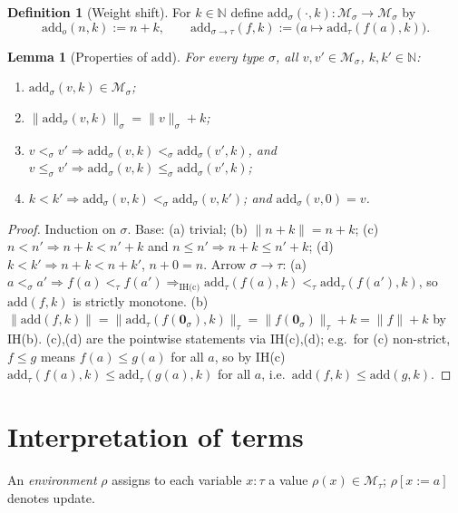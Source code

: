 \documentclass{amsart}
\newtheorem{lemma}{Lemma}
\theoremstyle{definition}
\newtheorem{definition}{Definition}
\begin{document}
\begin{definition}[Weight shift]\label{def:add}
For $k\in\mathbb N$ define $\mathrm{add}_\sigma(\cdot,k):\mathcal M_\sigma\to\mathcal M_\sigma$ by
\[
  \mathrm{add}_o(n,k):=n+k,\qquad
  \mathrm{add}_{\sigma\to\tau}(f,k):=\bigl(a\mapsto\mathrm{add}_\tau(f(a),k)\bigr).
\]
\end{definition}

\begin{lemma}[Properties of $\mathrm{add}$]\label{lem:add}
For every type $\sigma$, all $v,v'\in\mathcal M_\sigma$, $k,k'\in\mathbb N$:
\begin{enumerate}
\item[(a)] $\mathrm{add}_\sigma(v,k)\in\mathcal M_\sigma$;
\item[(b)] $\|\mathrm{add}_\sigma(v,k)\|_\sigma=\|v\|_\sigma+k$;
\item[(c)] $v<_\sigma v'\Rightarrow\mathrm{add}_\sigma(v,k)<_\sigma\mathrm{add}_\sigma(v',k)$,
  and $v\le_\sigma v'\Rightarrow\mathrm{add}_\sigma(v,k)\le_\sigma\mathrm{add}_\sigma(v',k)$;
\item[(d)] $k<k'\Rightarrow\mathrm{add}_\sigma(v,k)<_\sigma\mathrm{add}_\sigma(v,k')$;
  and $\mathrm{add}_\sigma(v,0)=v$.
\end{enumerate}
\end{lemma}

\begin{proof}
Induction on $\sigma$. Base: (a) trivial; (b) $\|n+k\|=n+k$; (c) $n<n'\Rightarrow n+k<n'+k$
and $n\le n'\Rightarrow n+k\le n'+k$; (d) $k<k'\Rightarrow n+k<n+k'$, $n+0=n$.
Arrow $\sigma\to\tau$: (a) $a<_\sigma a'\Rightarrow f(a)<_\tau f(a')\Rightarrow_{\text{IH(c)}}
\mathrm{add}_\tau(f(a),k)<_\tau\mathrm{add}_\tau(f(a'),k)$, so $\mathrm{add}(f,k)$ is strictly
monotone. (b) $\|\mathrm{add}(f,k)\|=\|\mathrm{add}_\tau(f(\mathbf 0_\sigma),k)\|_\tau=
\|f(\mathbf 0_\sigma)\|_\tau+k=\|f\|+k$ by IH(b). (c),(d) are the pointwise statements via
IH(c),(d); e.g.\ for (c) non-strict, $f\le g$ means $f(a)\le g(a)$ for all $a$, so by IH(c)
$\mathrm{add}_\tau(f(a),k)\le\mathrm{add}_\tau(g(a),k)$ for all $a$, i.e.\
$\mathrm{add}(f,k)\le\mathrm{add}(g,k)$.
\end{proof}

\section{Interpretation of terms}

An \emph{environment} $\rho$ assigns to each variable $x:\tau$ a value
$\rho(x)\in\mathcal M_\tau$; $\rho[x:=a]$ denotes update.
\end{document}
